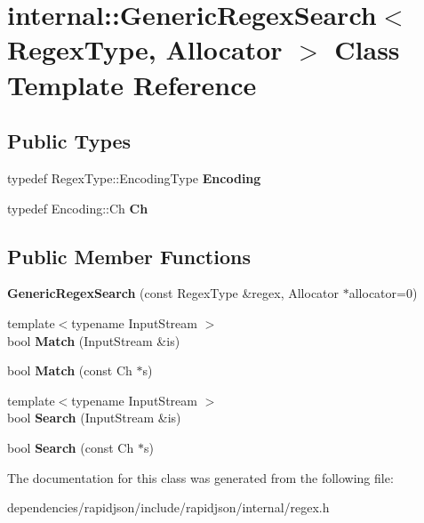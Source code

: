 \hypertarget{classinternal_1_1_generic_regex_search}{}\section{internal\+:\+:Generic\+Regex\+Search$<$ Regex\+Type, Allocator $>$ Class Template Reference}
\label{classinternal_1_1_generic_regex_search}
\subsection*{Public Types}
\begin{DoxyCompactItemize}
\item 
\mbox{\label{classinternal_1_1_generic_regex_search_a7b1f81c580c33200c83e1529c2fdbf54}} 
typedef Regex\+Type\+::\+Encoding\+Type {\bfseries Encoding}
\item 
\mbox{\label{classinternal_1_1_generic_regex_search_a966f3a62fc838b5e9350f4c6a624d9a1}} 
typedef Encoding\+::\+Ch {\bfseries Ch}
\end{DoxyCompactItemize}
\subsection*{Public Member Functions}
\begin{DoxyCompactItemize}
\item 
\mbox{\label{classinternal_1_1_generic_regex_search_a72f70e210a4bc944dba62655a008750b}} 
{\bfseries Generic\+Regex\+Search} (const Regex\+Type \&regex, Allocator $\ast$allocator=0)
\item 
\mbox{\label{classinternal_1_1_generic_regex_search_ad204164a20e3ac403b405683b51c2d0b}} 
{\footnotesize template$<$typename Input\+Stream $>$ }\\bool {\bfseries Match} (Input\+Stream \&is)
\item 
\mbox{\label{classinternal_1_1_generic_regex_search_a9d3fe83905549d2fd4c513b8eacd14de}} 
bool {\bfseries Match} (const Ch $\ast$s)
\item 
\mbox{\label{classinternal_1_1_generic_regex_search_a766c684321471b468ff468648f186cf0}} 
{\footnotesize template$<$typename Input\+Stream $>$ }\\bool {\bfseries Search} (Input\+Stream \&is)
\item 
\mbox{\label{classinternal_1_1_generic_regex_search_a97398161c60f3ed3e4aabaff952c6f1e}} 
bool {\bfseries Search} (const Ch $\ast$s)
\end{DoxyCompactItemize}


The documentation for this class was generated from the following file\+:\begin{DoxyCompactItemize}
\item 
dependencies/rapidjson/include/rapidjson/internal/regex.\+h\end{DoxyCompactItemize}
